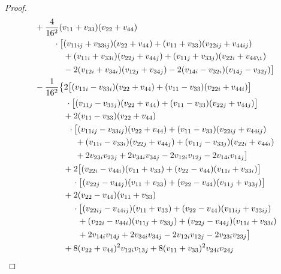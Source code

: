 \documentclass[11pt]{amsart}
\numberwithin{theorem}{section}
\numberwithin{equation}{section}
\begin{document}
\begin{proof}
\begin{align*}
&+\frac{4}{16^2}(v_{11}+v_{33})(v_{22}+v_{44})\\
&\hspace{0.8cm}\cdot\big[(v_{11ij}+v_{33ij})(v_{22}+v_{44})+(v_{11}+v_{33})(v_{22ij}+v_{44ij})\\
&\hspace{1.2cm}+(v_{11i}+v_{33i})(v_{22j}+v_{44j})+(v_{11j}+v_{33j})(v_{22i}+v_{44\i})\\
&\hspace{1.2cm}-2(v_{12i}+v_{34i})(v_{12j}+v_{34j})-2(v_{14i}-v_{32i})(v_{14j}-v_{32j})\big]\\
&-\frac{1}{16^2}\big\{2\big[(v_{11i}-v_{33i})(v_{22}+v_{44})+(v_{11}-v_{33})(v_{22i}+v_{44i})\big]\\
&\hspace{1.3cm}\cdot\big[(v_{11j}-v_{33j})(v_{22}+v_{44})+(v_{11}-v_{33})(v_{22j}+v_{44j})\big]\\
&\hspace{1.2cm}+2(v_{11}-v_{33})(v_{22}+v_{44})\\
&\hspace{1.4cm}\cdot\big[(v_{11ij}-v_{33ij})(v_{22}+v_{44})+(v_{11}-v_{33})(v_{22ij}+v_{44ij})\\
&\hspace{1.7cm}+(v_{11i}-v_{33i})(v_{22j}+v_{44j})+(v_{11j}-v_{33j})(v_{22i}+v_{44i})\\
&\hspace{1.7cm}+2v_{23i}v_{23j}+2v_{34i}v_{34j}-2v_{12i}v_{12j}-2v_{14i}v_{14j}\big]\\
&\hspace{1.2cm}+2\big[(v_{22i}-v_{44i})(v_{11}+v_{33})+(v_{22}-v_{44})(v_{11i}+v_{33i})\big]\\
&\hspace{1.6cm}\cdot\big[(v_{22j}-v_{44j})(v_{11}+v_{33})+(v_{22}-v_{44})(v_{11j}+v_{33j})\big]\\
&\hspace{1.2cm}+2(v_{22}-v_{44})(v_{11}+v_{33})\\
&\hspace{1.6cm}\cdot\big[(v_{22ij}-v_{44ij})(v_{11}+v_{33})+(v_{22}-v_{44})(v_{11ij}+v_{33ij})\\
&\hspace{1.8cm}+(v_{22i}-v_{44i})(v_{11j}+v_{33j})+(v_{22j}-v_{44j})(v_{11i}+v_{33i})\\
&\hspace{1.8cm}+2v_{14i}v_{14j}+2v_{34i}v_{34j}-2v_{12i}v_{12j}-2v_{23i}v_{23j}\big]\\
&\hspace{1.2cm}+8(v_{22}+v_{44})^2v_{12i}v_{13j}+8(v_{11}+v_{33})^2v_{24i}v_{24j}\\

\end{align*}
\end{proof}
\end{document}
